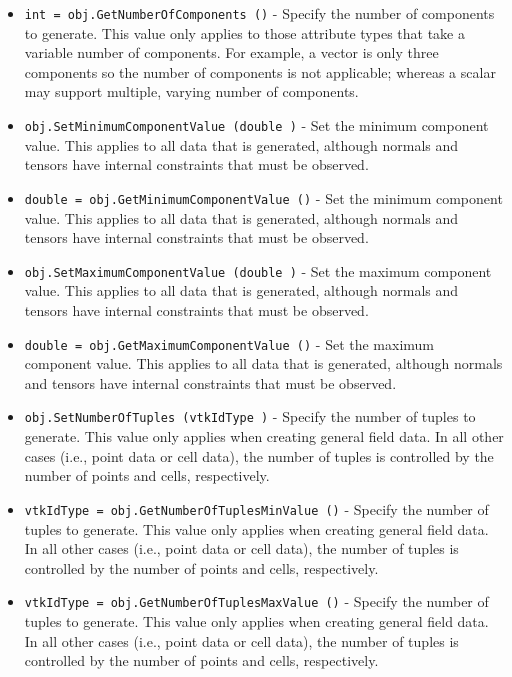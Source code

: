 \begin{itemize}
\item  \verb|int = obj.GetNumberOfComponents ()| -  Specify the number of components to generate. This value only applies to those
 attribute types that take a variable number of components. For example, a vector
 is only three components so the number of components is not applicable; whereas
 a scalar may support multiple, varying number of components.

\item  \verb|obj.SetMinimumComponentValue (double )| -  Set the minimum component value. This applies to all data that is generated, 
 although normals and tensors have internal constraints that must be 
 observed.

\item  \verb|double = obj.GetMinimumComponentValue ()| -  Set the minimum component value. This applies to all data that is generated, 
 although normals and tensors have internal constraints that must be 
 observed.

\item  \verb|obj.SetMaximumComponentValue (double )| -  Set the maximum component value. This applies to all data that is generated, 
 although normals and tensors have internal constraints that must be 
 observed.

\item  \verb|double = obj.GetMaximumComponentValue ()| -  Set the maximum component value. This applies to all data that is generated, 
 although normals and tensors have internal constraints that must be 
 observed.

\item  \verb|obj.SetNumberOfTuples (vtkIdType )| -  Specify the number of tuples to generate. This value only applies when creating
 general field data. In all other cases (i.e., point data or cell data), the number
 of tuples is controlled by the number of points and cells, respectively.

\item  \verb|vtkIdType = obj.GetNumberOfTuplesMinValue ()| -  Specify the number of tuples to generate. This value only applies when creating
 general field data. In all other cases (i.e., point data or cell data), the number
 of tuples is controlled by the number of points and cells, respectively.

\item  \verb|vtkIdType = obj.GetNumberOfTuplesMaxValue ()| -  Specify the number of tuples to generate. This value only applies when creating
 general field data. In all other cases (i.e., point data or cell data), the number
 of tuples is controlled by the number of points and cells, respectively.


\end{itemize}
